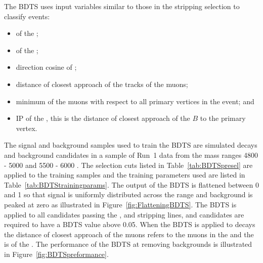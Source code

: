 The BDTS uses input variables similar to those in the stripping selection to classify events:
\begin{itemize}
\item \chiIP of the \bsd;
\item \chivtx of the \bsd;
\item direction cosine of \bsd;
\item distance of closest approach of the tracks of the muons;
\item minimum \chiIP of the muons with respect to all primary vertices in the event; and 
\item IP of the \bsd, this is the distance of closest approach of the $B$ to the primary vertex.
\end{itemize}
The signal and background samples used to train the BDTS are simulated \bsmumu decays and background candidates in a sample of Run~1 data from the mass ranges 4800 - 5000 \mevcc and 5500 - 6000 \mevcc. The selection cuts listed in Table~\ref{tab:BDTSpresel} are applied to the training samples and the training parameters used are listed in Table~\ref{tab:BDTStrainingparams}. The output of the BDTS is flattened between 0 and 1 so that signal is uniformly distributed across the range and background is peaked at zero as illustrated in Figure~\ref{fig:FlatteningBDTS}. The BDTS is applied to all candidates passing the \bmumu, \bhh and \bujpsik stripping lines, and candidates are required to have a BDTS value above 0.05. When the BDTS is applied to \bujpsik decays the distance of closest approach of the muons refers to the muons in the \jpsi and the \chivtx is of the \jpsi. %
The performance of the BDTS at removing backgrounds is illustrated in Figure~\ref{fig:BDTSpreformance}. %

